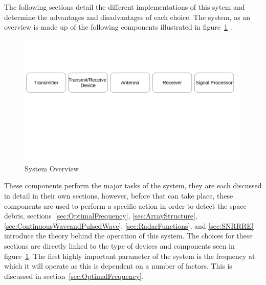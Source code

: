 \documentclass[11pt]{witseiepaper}
\begin{document}
The following sections detail the different implementations of this sytem and determine the advantages and disadvantages of each choice.
The system, as an overview is made up of the following components illustrated in figure~\ref{fig:SystemOverview} \cite{radarHandbook}.

\begin{center}
    \begin{figure}
        \includegraphics[width=\textwidth]{SystemOverview.pdf}
        \caption{System Overview}
        \label{fig:SystemOverview}    
    \end{figure}
\end{center}
These components perform the major tasks of the system, they are each discussed in detail in their own sections, however, before that can take place, these components are used to perform a specific action in order to detect the space debris, sections~\ref{sec:OptimalFrequency}, \ref{sec:ArrayStructure}, \ref{sec:ContinuousWaveandPulsedWave}, \ref{sec:RadarFunctions}, and \ref{sec:SNRRRE} introduce the theory behind the operation of this system. The choices for these sections are directly linked to the type of devices and components seen in figure~\ref{fig:SystemOverview}.
The first highly important parameter of the system is the frequency at which it will operate as this is dependent on a number of factors. This is discussed in section~\ref{sec:OptimalFrequency}.



\end{document}
